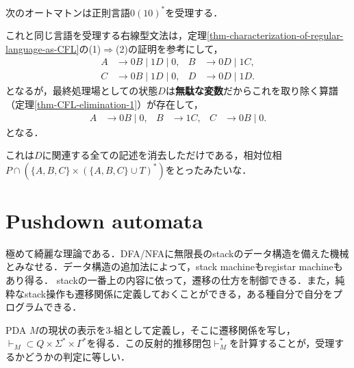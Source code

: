 \begin{example}[DFAを右線型文法へ翻訳する]
    次のオートマトンは正則言語$0(10)^*$を受理する．
    \begin{center}\end{center}
    これと同じ言語を受理する右線型文法は，定理\ref{thm-characterization-of-regular-language-as-CFL}の(1)$\Rightarrow$(2)の証明を参考にして，
    \begin{align*}
        A&\to 0B\mid 1D\mid 0,&B&\to 0D\mid 1C,\\
        C&\to 0B\mid 1D\mid 0,&D&\to 0D\mid 1D.
    \end{align*}
    となるが，最終処理場としての状態$D$は\textbf{無駄な変数}だからこれを取り除く算譜（定理\ref{thm-CFL-elimination-1}）が存在して，
    \begin{align*}
        A&\to 0B\mid 0,&B&\to 1C,&
        C&\to 0B\mid 0.
    \end{align*}
    となる．
\end{example}
\begin{remarks}
    これは$D$に関連する全ての記述を消去しただけである，相対位相$P\cap(\{A,B,C\}\times(\{A,B,C\}\cup T)^*)$をとったみたいな．
\end{remarks}

\section{Pushdown automata}

\begin{tcolorbox}[colframe=ForestGreen, colback=ForestGreen!10!white, breakable]
    極めて綺麗な理論である．DFA/NFAに無限長のstackのデータ構造を備えた機械とみなせる．データ構造の追加法によって，stack machineもregistar machineもあり得る．
    stackの一番上の内容に依って，遷移の仕方を制御できる．また，純粋なstack操作も遷移関係に定義しておくことができる，ある種自分で自分をプログラムできる．
    
    PDA $M$の現状の表示を3-組として定義し，そこに遷移関係を写し，$\vdash_M\subset Q\times\Sigma^*\times\Gamma^*$を得る．この反射的推移閉包$\vdash_M^*$を計算することが，受理するかどうかの判定に等しい．
\end{tcolorbox}

